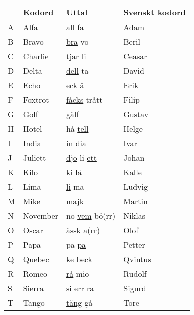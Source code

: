 \begin{table}[htbp]
  \small
  \begin{tabular}{llll}
      & Kodord     & Uttal                                 & Svenskt kodord  \\ \hline
    A & Alfa       & \underline{all} fa                    & Adam            \\
    B & Bravo      & \underline{bra} vo                    & Beril           \\
    C & Charlie    & \underline{tjar} li                   & Ceasar          \\
    D & Delta      & \underline{dell} ta                   & David           \\
    E & Echo       & \underline{eck} å                     & Erik            \\
    F & Foxtrot    & \underline{fåcks} trått               & Filip           \\
    G & Golf       & \underline{gålf}                      & Gustav          \\
    H & Hotel      & hå \underline{tell}                   & Helge           \\
    I & India      & \underline{in} dia                    & Ivar            \\
    J & Juliett    & \underline{djo} li \underline{ett}    & Johan           \\
    K & Kilo       & \underline{ki} lå                     & Kalle           \\
    L & Lima       & \underline{li} ma                     & Ludvig          \\
    M & Mike       & majk                                  & Martin          \\
    N & November   & no \underline{vem} bö(rr)             & Niklas          \\
    O & Oscar      & \underline{åssk} a(rr)                & Olof            \\
    P & Papa       & pa \underline{pa}                     & Petter          \\
    Q & Quebec     & ke \underline{beck}                   & Qvintus         \\
    R & Romeo      & \underline{rå} mio                    & Rudolf          \\
    S & Sierra     & si \underline{err} ra                 & Sigurd          \\
    T & Tango      & \underline{täng} gå                   & Tore            \\

\end{tabular}
\end{table}
